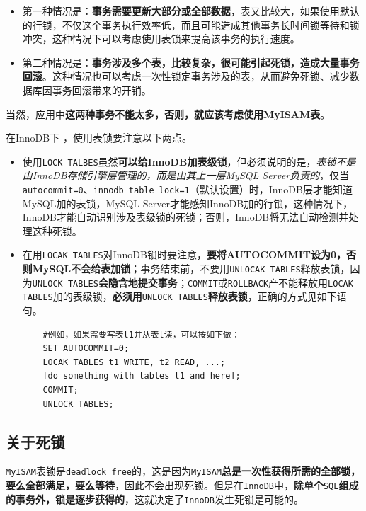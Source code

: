 \documentclass[UTF8,a4paper,12pt]{ctexbook}
\begin{document}
			\begin{itemize}
				\item 第一种情况是：\textbf{事务需要更新大部分或全部数据}，表又比较大，如果使用默认的行锁，不仅这个事务执行效率低，而且可能造成其他事务长时间锁等待和锁冲突，这种情况下可以考虑使用表锁来提高该事务的执行速度。
				\item 第二种情况是：\textbf{事务涉及多个表，比较复杂，很可能引起死锁，造成大量事务回滚}。这种情况也可以考虑一次性锁定事务涉及的表，从而避免死锁、减少数据库因事务回滚带来的开销。
			\end{itemize}
		
			当然，应用中\textbf{这两种事务不能太多，否则，就应该考虑使用MyISAM表}。
			
			在InnoDB下 ，使用表锁要注意以下两点。
			
			\begin{itemize}
				\item 使用\verb|LOCK TALBES|虽然\textbf{可以给InnoDB加表级锁}，但必须说明的是，\textit{表锁不是由InnoDB存储引擎层管理的，而是由其上一层MySQL Server负责的}，仅当\verb|autocommit=0|、\verb|innodb_table_lock=1|（默认设置）时，InnoDB层才能知道MySQL加的表锁，MySQL Server才能感知InnoDB加的行锁，这种情况下，InnoDB才能自动识别涉及表级锁的死锁；否则，InnoDB将无法自动检测并处理这种死锁。
				\item 在用\verb|LOCAK TABLES|对InnoDB锁时要注意，\textbf{要将AUTOCOMMIT设为0，否则MySQL不会给表加锁}；事务结束前，不要用\verb|UNLOCAK TABLES|释放表锁，因为\verb|UNLOCK TABLES|\textbf{会隐含地提交事务}；\verb|COMMIT|或\verb|ROLLBACK|产不能释放用\verb|LOCAK TABLES|加的表级锁，\textbf{必须用}\verb|UNLOCK TABLES|\textbf{释放表锁}，正确的方式见如下语句。
				
				\begin{lstlisting}
	#例如，如果需要写表t1并从表t读，可以按如下做：	
	SET AUTOCOMMIT=0;
	LOCAK TABLES t1 WRITE, t2 READ, ...;
	[do something with tables t1 and here];
	COMMIT;
	UNLOCK TABLES;		
				\end{lstlisting}
				
			\end{itemize}
			
			
		\subsection{关于死锁}
			\verb|MyISAM|表锁是\verb|deadlock free|的，这是因为\verb|MyISAM|\textbf{总是一次性获得所需的全部锁，要么全部满足，要么等待}，因此不会出现死锁。但是在\verb|InnoDB|中，\textbf{除单个}\verb|SQL|\textbf{组成的事务外，锁是逐步获得的}，这就决定了\verb|InnoDB|发生死锁是可能的。
	
\end{document}
